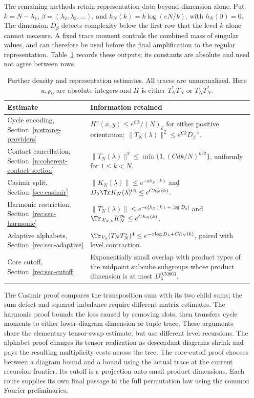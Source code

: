 The remaining methods retain representation data beyond dimension
alone. Put $k=N-\lambda_1$, $\beta=(\lambda_2,\lambda_3,\ldots)$,
and $h_N(k)=k\log(eN/k)$, with $h_N(0)=0$. The dimension $D_\beta$
detects complexity below the first row that the level $k$ alone cannot
measure. A fixed trace moment controls the combined mass of singular
values, and can therefore be used before the final amplification to
the regular representation. Table~\ref{tab:methods} records these
outputs; its constants are absolute and need not agree between rows.
\begin{table}[ht]
\centering
\small
\begin{tabular}{@{}>{\raggedright\arraybackslash}p{.24\linewidth}>{\raggedright\arraybackslash}p{.66\linewidth}@{}}
\toprule
Estimate & Information retained \\
\midrule
Cycle encoding, Section~\ref{n:strong-providers}
 & $H^u(x,y)\le e^{Ck}/(N)_k$ for either positive orientation;
 $\|T_N(\lambda)\|^2\le e^{Ck}D_\beta^{-a}$. \\
Contact cancellation, Section~\ref{n:coherent-contact-section}
 & $\|T_N(\lambda)\|^2\le\min\{1,(Cdk/N)^{k/2}\}$,
 uniformly for $1\le k<N$. \\
Casimir split, Section~\ref{sec:casimir}
 & $\|K_N(\lambda)\|\le e^{-a h_N(k)}$ and
 $D_\lambda\Tr K_N(\lambda)^{65}\le e^{C h_N(k)}$. \\
Harmonic restriction, Section~\ref{rec:sec-harmonic}
 & $\|T_N(\lambda)\|\le e^{-c\{h_N(k)+\log D_\beta\}}$ and
 $\Tr_{\mathcal X_{N,k}}K_N^{p_0}\le e^{C h_N(k)}$. \\
Adaptive alphabets, Section~\ref{rec:sec-adaptive}
 & $\Tr_{V_\lambda}(T_NT_N^*)^4
 \le e^{-c\log D_\lambda+C h_N(k)}$, paired with level contraction. \\
Core cutoff, Section~\ref{rec:sec-cutoff}
 & Exponentially small overlap with product types of the midpoint
 subcube subgroups whose product dimension is at most
 $D_\lambda^{0.50003}$. \\
\bottomrule
\end{tabular}
\caption{Further density and representation estimates.
All traces are unnormalized. Here $u,p_0$ are absolute integers and
$H$ is either $T_N^*T_N$ or $T_NT_N^*$.}
\label{tab:methods}
\end{table}

The Casimir proof compares the transposition sum with its two child
sums; the sum defect and squared imbalance require different matrix
estimates. The harmonic proof bounds the loss caused by removing
slots, then transfers cycle moments to either lower-diagram dimension
or tuple trace. These arguments share the elementary tensor-swap
estimate, but use different level recursions. The alphabet proof
changes its tensor realization as descendant diagrams shrink and pays
the resulting multiplicity costs across the tree. The core-cutoff
proof chooses between a diagram bound and a bound using the actual
trace at the current recursion frontier. Its cutoff is a projection
onto small product dimensions. Each route supplies its own final
passage to the full permutation law using the common Fourier
preliminaries.

